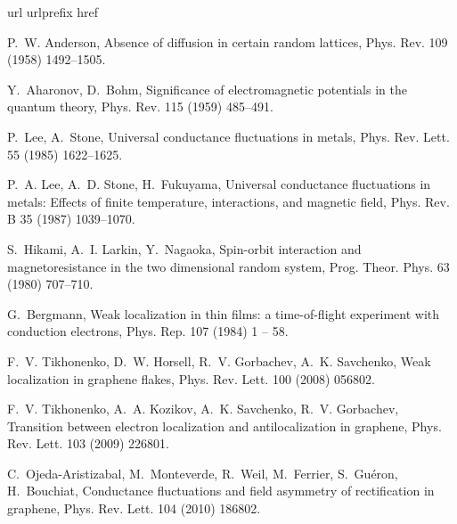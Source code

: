 \documentclass[final,5p,times,twocolumn]{elsarticle}
\begin{document}
 

%

\begin{thebibliography}{10}
\expandafter\ifx\csname url\endcsname\relax
  \def\url#1{\texttt{#1}}\fi
\expandafter\ifx\csname urlprefix\endcsname\relax\def\urlprefix{URL }\fi
\expandafter\ifx\csname href\endcsname\relax
  \def\href#1#2{#2} \def\path#1{#1}\fi

P.~W. Anderson,
  \href{https://link.aps.org/doi/10.1103/PhysRev.109.1492}{Absence of diffusion
  in certain random lattices}, Phys. Rev. 109 (1958) 1492--1505.

Y.~Aharonov, D.~Bohm,
  \href{https://link.aps.org/doi/10.1103/PhysRev.115.485}{Significance of
  electromagnetic potentials in the quantum theory}, Phys. Rev. 115 (1959)
  485--491.

P.~Lee, A.~Stone,
  \href{http://link.aps.org/doi/10.1103/PhysRevLett.55.1622}{Universal
  conductance fluctuations in metals}, Phys. Rev. Lett. 55 (1985) 1622--1625.

P.~A. Lee, A.~D. Stone, H.~Fukuyama,
  \href{http://link.aps.org/doi/10.1103/PhysRevB.35.1039}{Universal conductance
  fluctuations in metals: Effects of finite temperature, interactions, and
  magnetic field}, Phys. Rev. B 35 (1987) 1039--1070.

S.~Hikami, A.~I. Larkin, Y.~Nagaoka, \href{https://doi.org/10.1143/PTP.63.707}{Spin-orbit interaction and
  magnetoresistance in the two dimensional random system}, Prog. Theor. Phys. 63
  (1980) 707--710.

G.~Bergmann, Weak localization in thin films: a time-of-flight experiment with
  conduction electrons, Phys. Rep. 107 (1984) 1 -- 58.

F.~V. Tikhonenko, D.~W. Horsell, R.~V. Gorbachev, A.~K. Savchenko,
  \href{http://link.aps.org/doi/10.1103/PhysRevLett.100.056802}{Weak
  localization in graphene flakes}, Phys. Rev. Lett. 100 (2008) 056802.

F.~V. Tikhonenko, A.~A. Kozikov, A.~K. Savchenko, R.~V. Gorbachev,
  \href{http://link.aps.org/doi/10.1103/PhysRevLett.103.226801}{Transition
  between electron localization and antilocalization in graphene}, Phys. Rev.
  Lett. 103 (2009) 226801.

C.~Ojeda-Aristizabal, M.~Monteverde, R.~Weil, M.~Ferrier, S.~Gu\'eron,
  H.~Bouchiat,
  \href{http://link.aps.org/doi/10.1103/PhysRevLett.104.186802}{Conductance
  fluctuations and field asymmetry of rectification in graphene}, Phys. Rev.
  Lett. 104 (2010) 186802.


\end{thebibliography}
\end{document}
